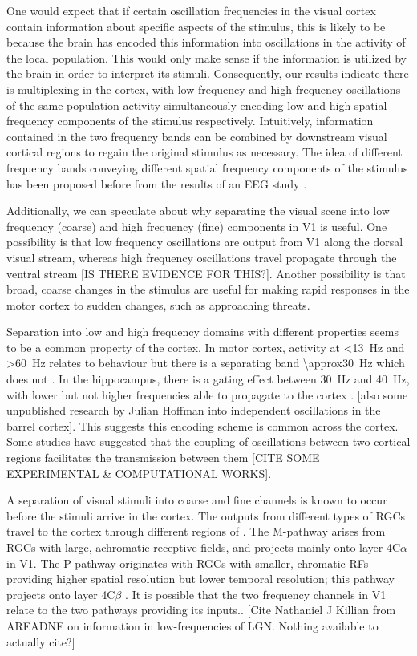 One would expect that if certain oscillation frequencies in the visual cortex contain information about specific aspects of the stimulus, this is likely to be because the brain has encoded this information into oscillations in the activity of the local population.
This would only make sense if the information is utilized by the brain in order to interpret its stimuli.
Consequently, our results indicate there is multiplexing in the cortex, with low frequency and high frequency oscillations of the same population activity simultaneously encoding low and high spatial frequency components of the stimulus respectively.
Intuitively, information contained in the two frequency bands can be combined by downstream visual cortical regions to regain the original stimulus as necessary.
The idea of different frequency bands conveying different spatial frequency components of the stimulus has been proposed before from the results of an \ac{EEG} study \citep{Smith2006}.

Additionally, we can speculate about why separating the visual scene into low frequency (coarse) and high frequency (fine) components in \ac{V1} is useful.
One possibility is that low frequency oscillations are output from \ac{V1} along the dorsal visual stream, whereas high frequency oscillations travel propagate through the ventral stream [IS THERE EVIDENCE FOR THIS?].
Another possibility is that broad, coarse changes in the stimulus are useful for making rapid responses in the motor cortex to sudden changes, such as approaching threats.

Separation into low and high frequency domains with different properties seems to be a common property of the cortex.
In motor cortex, activity at \SI{<13}{Hz} and \SI{>60}{Hz} relates to behaviour but there is a separating band \SI{\approx30}{Hz} which does not \citep{Rickert2005}.
In the hippocampus, there is a gating effect between \SI{30}{Hz} and \SI{40}{Hz}, with lower but not higher frequencies able to propagate to the cortex \citep{Moreno2015}.
[also some unpublished research by Julian Hoffman into independent oscillations in the barrel cortex].
This suggests this encoding scheme is common across the cortex.
Some studies have suggested that the coupling of oscillations between two cortical regions facilitates the transmission between them [CITE SOME EXPERIMENTAL \& COMPUTATIONAL WORKS].

A separation of visual stimuli into coarse and fine channels is known to occur before the stimuli arrive in the cortex.
The outputs from different types of \acp{RGC} travel to the cortex through different regions of .
The M-pathway arises from \acp{RGC} with large, achromatic receptive fields, and projects mainly onto layer 4C$\alpha$ in \ac{V1}.
The P-pathway originates with \acp{RGC} with smaller, chromatic \acp{RF} providing higher spatial resolution but lower temporal resolution; this pathway projects onto layer 4C$\beta$ \citep{Callaway1998}.
It is possible that the two frequency channels in \ac{V1} relate to the two pathways providing its inputs..
[Cite Nathaniel J Killian from AREADNE on information in low-frequencies of \ac{LGN}.
Nothing available to actually cite?]

